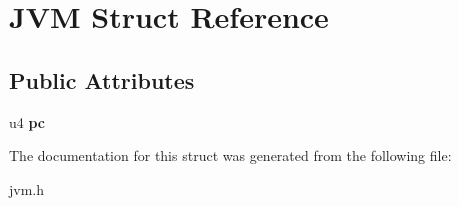\hypertarget{structJVM}{}\section{J\+VM Struct Reference}
\label{structJVM}
\subsection*{Public Attributes}
\begin{DoxyCompactItemize}
\item 
u4 {\bfseries pc}\hypertarget{structJVM_aeacbab6a3ba9b278832add772ad82a19}{}\label{structJVM_aeacbab6a3ba9b278832add772ad82a19}

\end{DoxyCompactItemize}


The documentation for this struct was generated from the following file\+:\begin{DoxyCompactItemize}
\item 
jvm.\+h\end{DoxyCompactItemize}
